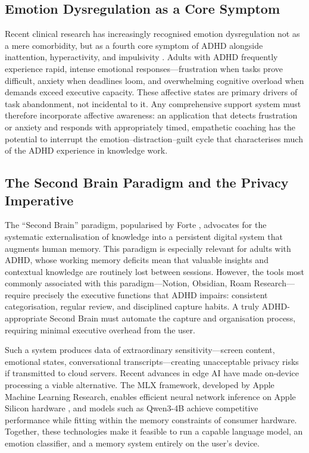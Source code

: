 \subsection{Emotion Dysregulation as a Core Symptom}
\label{subsec:emotion-dysregulation}

Recent clinical research has increasingly recognised emotion dysregulation not as a mere comorbidity, but as a fourth core symptom of ADHD alongside inattention, hyperactivity, and impulsivity \cite{beattie2025}. Adults with ADHD frequently experience rapid, intense emotional responses---frustration when tasks prove difficult, anxiety when deadlines loom, and overwhelming cognitive overload when demands exceed executive capacity. These affective states are primary drivers of task abandonment, not incidental to it. Any comprehensive support system must therefore incorporate affective awareness: an application that detects frustration or anxiety and responds with appropriately timed, empathetic coaching has the potential to interrupt the emotion--distraction--guilt cycle that characterises much of the ADHD experience in knowledge work.

\subsection{The Second Brain Paradigm and the Privacy Imperative}
\label{subsec:second-brain-privacy}

The ``Second Brain'' paradigm, popularised by Forte \cite{forte2022}, advocates for the systematic externalisation of knowledge into a persistent digital system that augments human memory. This paradigm is especially relevant for adults with ADHD, whose working memory deficits mean that valuable insights and contextual knowledge are routinely lost between sessions. However, the tools most commonly associated with this paradigm---Notion, Obsidian, Roam Research---require precisely the executive functions that ADHD impairs: consistent categorisation, regular review, and disciplined capture habits. A truly ADHD-appropriate Second Brain must automate the capture and organisation process, requiring minimal executive overhead from the user.

Such a system produces data of extraordinary sensitivity---screen content, emotional states, conversational transcripts---creating unacceptable privacy risks if transmitted to cloud servers. Recent advances in edge AI have made on-device processing a viable alternative. The MLX framework, developed by Apple Machine Learning Research, enables efficient neural network inference on Apple Silicon hardware \cite{hannun2023}, and models such as Qwen3-4B \cite{yang2025} achieve competitive performance while fitting within the memory constraints of consumer hardware. Together, these technologies make it feasible to run a capable language model, an emotion classifier, and a memory system entirely on the user's device.


